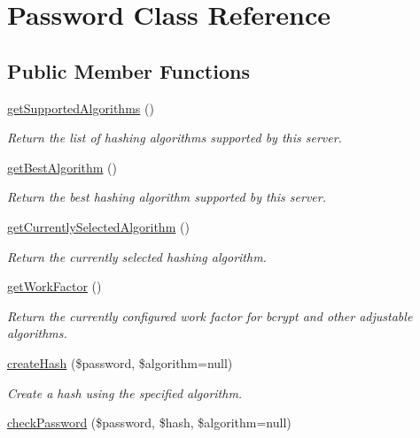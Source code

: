 \hypertarget{classPassword}{}\section{Password Class Reference}
\label{classPassword}
\subsection*{Public Member Functions}
\begin{DoxyCompactItemize}
\item 
\hyperlink{classPassword_a4983366e7b062e052e6d9f716aa3e59c}{get\+Supported\+Algorithms} ()
\begin{DoxyCompactList}\small\item\em Return the list of hashing algorithms supported by this server. \end{DoxyCompactList}\item 
\hyperlink{classPassword_a191be9b3e77eea80b6d97b7bfaaba288}{get\+Best\+Algorithm} ()
\begin{DoxyCompactList}\small\item\em Return the best hashing algorithm supported by this server. \end{DoxyCompactList}\item 
\hyperlink{classPassword_afd4c3a1daf246f73845a1f0c60cd17d8}{get\+Currently\+Selected\+Algorithm} ()
\begin{DoxyCompactList}\small\item\em Return the currently selected hashing algorithm. \end{DoxyCompactList}\item 
\hyperlink{classPassword_a2c41d8ed7334ffeef9a0b2778b86d8f7}{get\+Work\+Factor} ()
\begin{DoxyCompactList}\small\item\em Return the currently configured work factor for bcrypt and other adjustable algorithms. \end{DoxyCompactList}\item 
\hyperlink{classPassword_a85d7612e366f741aab750d10b415ca48}{create\+Hash} (\$password, \$algorithm=null)
\begin{DoxyCompactList}\small\item\em Create a hash using the specified algorithm. \end{DoxyCompactList}\item 
\hyperlink{classPassword_aa9ea10a8c7fab644cbe255eed95c06e8}{check\+Password} (\$password, \$hash, \$algorithm=null)

\end{DoxyCompactItemize}
